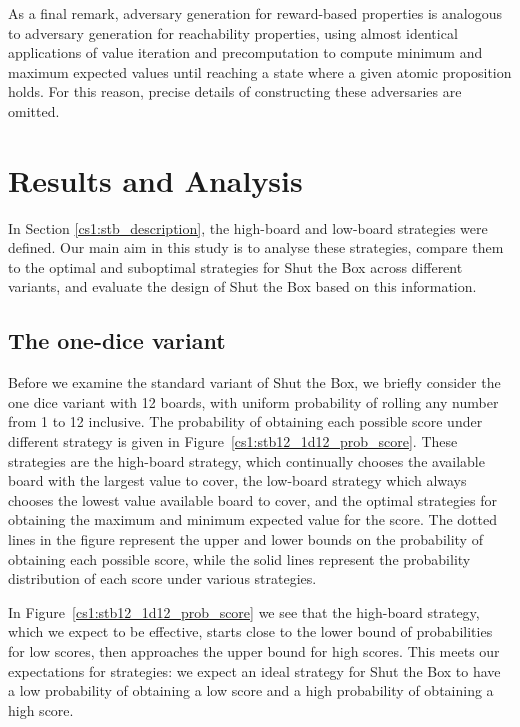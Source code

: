 As a final remark, adversary generation for reward-based properties is analogous to adversary generation for reachability properties, using almost identical applications of value iteration and precomputation to compute minimum and maximum expected values until reaching a state where a given atomic proposition holds. For this reason, precise details of constructing these adversaries are omitted. 

\section{Results and Analysis}
\label{cs1:stb_results}

In Section \ref{cs1:stb_description}, the high-board and low-board strategies were defined. Our main aim in this study is to analyse these strategies, compare them to the optimal and suboptimal strategies for Shut the Box across different variants, and evaluate the design of Shut the Box based on this information.

\subsection{The one-dice variant}
\label{cs1:stb_one_dice}

Before we examine the standard variant of Shut the Box, we briefly consider the one dice variant with 12 boards, with uniform probability of rolling any number from 1 to 12 inclusive. The probability of obtaining each possible score under different strategy is given in Figure~\ref{cs1:stb12_1d12_prob_score}. These strategies are the high-board strategy, which continually chooses the available board with the largest value to cover, the low-board strategy which always chooses the lowest value available board to cover, and the optimal strategies for obtaining the maximum and minimum expected value for the score. The dotted lines in the figure represent the upper and lower bounds on the probability of obtaining each possible score, while the solid lines represent the probability distribution of each score under various strategies. 

In Figure~\ref{cs1:stb12_1d12_prob_score} we see that the high-board strategy, which we expect to be effective, starts close to the lower bound of probabilities for low scores, then approaches the upper bound for high scores. This meets our expectations for strategies: we expect an ideal strategy for Shut the Box to have a low probability of obtaining a low score and a high probability of obtaining a high score. 

